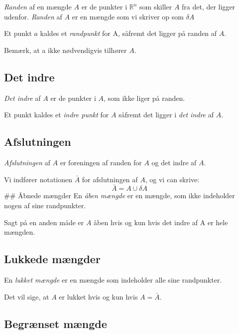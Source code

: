 \emph{Randen} af en mængde \(A\) er de punkter i \(\mathbb{R}^n\) som
skiller \(A\) fra det, der ligger udenfor. \emph{Randen} af \(A\) er en
mængde som vi skriver op som \(\delta A\)

Et punkt \(a\) kaldes et \emph{randpunkt} for A, såfremt det ligger på
randen af \(A\).

Bemærk, at a ikke nødvendigvis tilhører \(A\).

\hypertarget{det-indre}{%
\subsection{Det indre}\label{det-indre}}

\emph{Det indre} af \(A\) er de punkter i \(A\), som ikke liger på
randen.

Et punkt kaldes et \emph{indre punkt} for \(A\) såfremt det ligger i
\emph{det indre} af \(A\).

\hypertarget{afslutningen}{%
\subsection{Afslutningen}\label{afslutningen}}

\emph{Afslutningen} af \(A\) er foreningen af randen for \(A\) og det
indre af \(A\).

Vi indfører notationen \(\bar{A}\) for afslutningen af \(A\), og vi can
skrive: \[
\bar{A}=A\cup\delta A
\] \#\# Åbnede mængder En \emph{åben mængde} er en mængde, som ikke
indeholder nogen af sine randpunkter.

Sagt på en anden måde er \(A\) åben hvis og kun hvis det indre af A er
hele mængden.

\hypertarget{lukkede-muxe6ngder}{%
\subsection{Lukkede mængder}\label{lukkede-muxe6ngder}}

En \emph{lukket mængde} er en mængde som indeholder alle sine
randpunkter.

Det vil sige, at \(A\) er lukket hvis og kun hvis \(A=\bar{A}\).

\hypertarget{begruxe6nset-muxe6ngde}{%
\subsection{Begrænset mængde}\label{begruxe6nset-muxe6ngde}}
